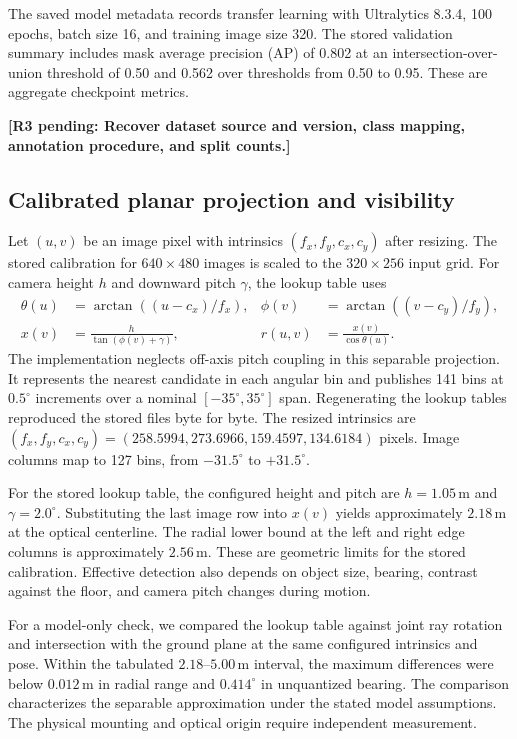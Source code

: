 \documentclass[pdflatex,sn-mathphys-num]{sn-jnl}
\newif\ifdraftreview
\newcommand{\reviewbadge}[1]{%
  \colorbox{reviewfill}{\textcolor{reviewink}{\sffamily\bfseries\strut #1}}}
\newcommand{\pending}[2]{%
  \ifdraftreview
    \hyperlink{author-checklist}{\reviewbadge{#1}}\nobreak\space
    \textcolor{reviewink}{\textbf{[Pending: #2]}}%
  \else
    \textbf{[#1 pending: #2]}%
  \fi}
\newcommand{\m}{\,\mathrm{m}}
\begin{document}
The saved model metadata records transfer learning with Ultralytics 8.3.4, 100 epochs, batch size 16, and training image size 320. The stored validation summary includes mask average precision (AP) of 0.802 at an intersection-over-union threshold of 0.50 and 0.562 over thresholds from 0.50 to 0.95. These are aggregate checkpoint metrics. \pending{R3}{Recover dataset source and version, class mapping, annotation procedure, and split counts.}

\subsection{Calibrated planar projection and visibility}

Let $(u,v)$ be an image pixel with intrinsics $(f_x,f_y,c_x,c_y)$ after resizing. The stored calibration for $640\times480$ images is scaled to the $320\times256$ input grid. For camera height $h$ and downward pitch $\gamma$, the lookup table uses
\begin{align}
 \theta(u) &= \arctan((u-c_x)/f_x), &
 \phi(v) &= \arctan((v-c_y)/f_y), \\
 x(v) &= \frac{h}{\tan(\phi(v)+\gamma)}, &
 r(u,v) &= \frac{x(v)}{\cos\theta(u)} .
\end{align}
The implementation neglects off-axis pitch coupling in this separable projection. It represents the nearest candidate in each angular bin and publishes 141 bins at $0.5^\circ$ increments over a nominal $[-35^\circ,35^\circ]$ span. Regenerating the lookup tables reproduced the stored files byte for byte. The resized intrinsics are $(f_x,f_y,c_x,c_y)=(258.5994,273.6966,159.4597,134.6184)$ pixels. Image columns map to 127 bins, from $-31.5^\circ$ to $+31.5^\circ$.

For the stored lookup table, the configured height and pitch are $h=1.05\m$ and $\gamma=2.0^\circ$. Substituting the last image row into $x(v)$ yields approximately $2.18\m$ at the optical centerline. The radial lower bound at the left and right edge columns is approximately $2.56\m$. These are geometric limits for the stored calibration. Effective detection also depends on object size, bearing, contrast against the floor, and camera pitch changes during motion.

For a model-only check, we compared the lookup table against joint ray rotation and intersection with the ground plane at the same configured intrinsics and pose. Within the tabulated $2.18$--$5.00\m$ interval, the maximum differences were below $0.012\m$ in radial range and $0.414^\circ$ in unquantized bearing. The comparison characterizes the separable approximation under the stated model assumptions. The physical mounting and optical origin require independent measurement.
\end{document}
